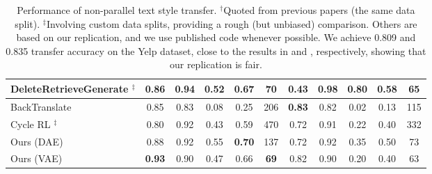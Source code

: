 \documentclass[letterpaper]{article} %
\begin{document}
\begin{table}[!t]
{\begin{tabular}{|l||c|c|c|c|c||c|c|c|c|c| }
			DeleteRetrieveGenerate \cite{li2018delete} $^\ddag$ & 0.86                                        & 0.94                                         & 0.52                         & 0.67              & 70                            & 0.43                          & \textbf{0.98}                & \textbf{0.80}                & \textbf{0.58}     & 65                            \\ \hline
			BackTranslate \cite{prabhumoye2018style}            & 0.85                                        & 0.83                                         & 0.08                         & 0.25              & 206                           & \textbf{0.83}                 & 0.82                         & 0.02                         & 0.13              & 115                           \\ \hline
			Cycle RL \cite{xu2018unpaired} $^\ddag$             & 0.80                                        & 0.92                                         & 0.43                         & 0.59              & 470                           & 0.72                          & 0.91                         & 0.22                         & 0.40              & 332                           \\ \hline\hline
			Ours (DAE)                                          & 0.88                                        & 0.92                                         & 0.55                         & \textbf{0.70}     & 137                           & 0.72                          & 0.92                         & 0.35                         & 0.50              & 73                            \\ \hline
			Ours (VAE)                                          & \textbf{0.93}                               & 0.90                                         & 0.47                         & 0.66              & \textbf{69}                   & 0.82                          & 0.90                         & 0.20                         & 0.40              & 63                            \\ \hline
		\end{tabular}}\vspace{-.2cm}
	\caption{Performance of non-parallel text style transfer.  $^\dag$Quoted from previous papers (the same data split). $^\ddag$Involving custom data splits, providing a rough (but unbiased) comparison. Others are based on our replication, and we use published code whenever possible. We achieve 0.809 and 0.835 transfer accuracy on the Yelp dataset, close to the results in \citet{shen2017style} and \citet{zhao2018adversarially}, respectively, showing that our replication is fair.}\vspace{-.2cm}
	\label{tab:yelp-comparison-previous}
\end{table}
\end{document}
